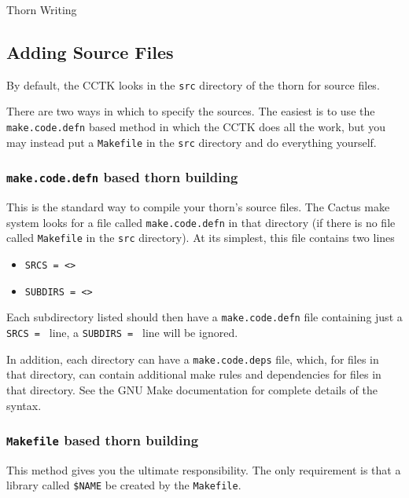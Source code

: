 \begin{cactuspart}{Thorn Writing}
\subsection{Adding Source Files}

By default, the CCTK looks in the \texttt{src} directory of the thorn for source
files.

There are two ways in which to specify the sources.  The easiest is to use the
\texttt{make.code.defn} based method in which the CCTK does all the work, but you
may instead put a \texttt{Makefile} in the \texttt{src} directory and do everything
yourself.

\subsubsection{\texttt{make.code.defn} based thorn building}
\label{sec:mabathbu}

This is the standard way to compile your thorn's source files.
The Cactus make system looks for a file called \texttt{make.code.defn} in that
directory (if there is no file called \texttt{Makefile} in the \texttt{src} directory).  At its simplest, this file contains two lines

\begin{itemize}
\item \texttt{SRCS = <>}

\item \texttt{SUBDIRS = <>}

\end{itemize}

Each subdirectory listed should then have a \texttt{make.code.defn} file
containing just a \texttt{SRCS = } line, a \texttt{SUBDIRS = } line will
be ignored.

In addition, each directory can have a \texttt{make.code.deps} file, which,
for files in that directory, can contain additional make rules and dependencies
for files in that directory.  See the GNU Make documentation for complete details of the
syntax.

\subsubsection{\texttt{Makefile} based thorn building}

This method gives you the ultimate responsibility.
The only requirement is that
a library called \texttt{\$NAME} be created by the \texttt{Makefile}.


\end{cactuspart}

